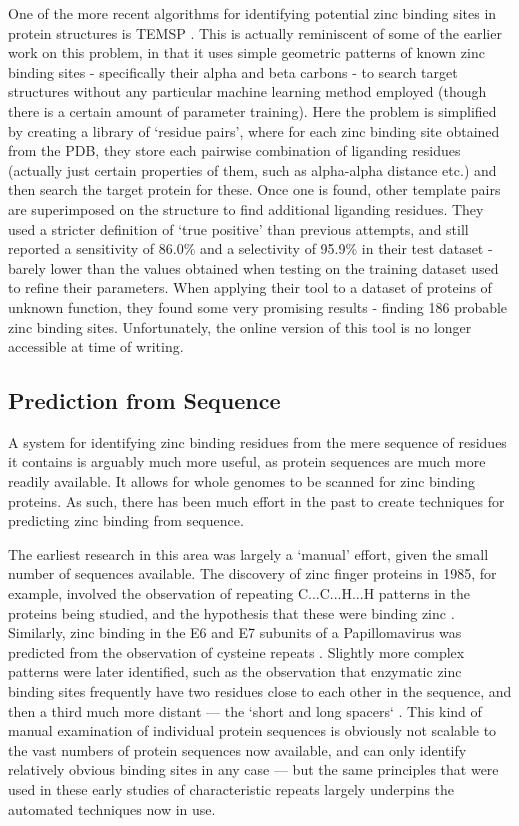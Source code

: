 One of the more recent algorithms for identifying potential zinc binding sites in protein structures is TEMSP \cite{zhao2011structure}. This is actually reminiscent of some of the earlier work on this problem, in that it uses simple geometric patterns of known zinc binding sites - specifically their alpha and beta carbons - to search target structures without any particular machine learning method employed (though there is a certain amount of parameter training). Here the problem is simplified by creating a library of `residue pairs', where for each zinc binding site obtained from the PDB, they store each pairwise combination of liganding residues (actually just certain properties of them, such as alpha-alpha distance etc.) and then search the target protein for these. Once one is found, other template pairs are superimposed on the structure to find additional liganding residues. They used a stricter definition of `true positive' than previous attempts, and still reported a sensitivity of 86.0\% and a selectivity of 95.9\% in their test dataset - barely lower than the values obtained when testing on the training dataset used to refine their parameters. When applying their tool to a dataset of proteins of unknown function, they found some very promising results - finding 186 probable zinc binding sites.  Unfortunately, the online version of this tool is no longer accessible at time of writing.

\subsection{Prediction from Sequence}

A system for identifying zinc binding residues from the mere sequence of residues it contains is arguably much more useful, as protein sequences are much more readily available. It allows for whole genomes to be scanned for zinc binding proteins. As such, there has been much effort in the past to create techniques for predicting zinc binding from sequence.

The earliest research in this area was largely a `manual' effort, given the small number of sequences available. The discovery of zinc finger proteins in 1985, for example, involved the observation of repeating C...C...H...H patterns in the proteins being studied, and the hypothesis that these were binding zinc \cite{miller1985repetitive}. Similarly, zinc binding in the E6 and E7 subunits of a Papillomavirus was predicted from the observation of cysteine repeats \cite{barbosa1989papillomavirus}. Slightly more complex patterns were later identified, such as the observation that enzymatic zinc binding sites frequently have two residues close to each other in the sequence, and then a third much more distant --- the `short and long spacers` \cite{vallee1989short}. This kind of manual examination of individual protein sequences is obviously not scalable to the vast numbers of protein sequences now available, and can only identify relatively obvious binding sites in any case --- but the same principles that were used in these early studies of characteristic repeats largely underpins the automated techniques now in use.

